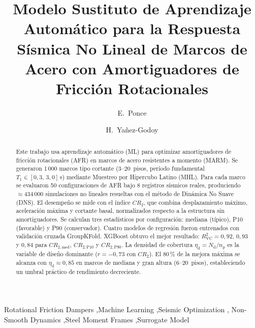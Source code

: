 \documentclass[preprint,12pt,authoryear]{elsarticle}
\newcommand{\CR}[1]{CR_{2,\text{#1}}}
\newcommand{\Rsq}{R^{2}_{\mathrm{VC}}}
\newcommand{\nd}{N_{\mathrm{d}}}
\newcommand{\np}{n_{\mathrm{p}}}
\newcommand{\etad}{\eta_{\mathrm{d}}}
\begin{document}
\begin{frontmatter}

\title{Modelo Sustituto de Aprendizaje Automático para la Respuesta Sísmica
       No Lineal de Marcos de Acero con Amortiguadores de Fricción Rotacionales}

\author[uaq]{E.~Ponce}
\author[i2m]{H.~Yañez-Godoy}

\address[uaq]{Universidad Autónoma de Querétaro, Facultad de Ingeniería,
              Cerro de las Campanas s/n, Querétaro, México}
\address[i2m]{Arts et Metiers Institute of Technology, University of Bordeaux,
              Centre National de la Recherche Scientifique (CNRS),
              Bordeaux INP, I2M, UMR 5295, 33400 Talence, France}

\begin{abstract}
Este trabajo usa aprendizaje automático (ML) para optimizar amortiguadores de
fricción rotacionales (AFR) en marcos de acero resistentes a momento (MARM).
Se generaron 1\,000 marcos tipo cortante (3--20~pisos, período fundamental
$T_1 \in [0{,}3,\,3{,}0]$\,s) mediante Muestreo por Hipercubo Latino (MHL).
Para cada marco se evaluaron 50 configuraciones de AFR bajo 8 registros
sísmicos reales, produciendo $\approx$434\,000 simulaciones no lineales
resueltas con el método de Dinámica No Suave (DNS). El desempeño se mide con
el índice $CR_2$, que combina desplazamiento máximo, aceleración máxima y
cortante basal, normalizados respecto a la estructura sin amortiguadores. Se
calculan tres estadísticos por configuración: mediana (típico), P10 (favorable)
y P90 (conservador). Cuatro modelos de regresión fueron entrenados con
validación cruzada GroupKFold. XGBoost obtuvo el mejor resultado:
$\Rsq = 0{,}92$, $0{,}93$ y $0{,}84$ para $\CR{med}$, $\CR{P10}$ y
$\CR{P90}$. La densidad de cobertura $\etad = \nd/\np$ es la variable de
diseño dominante ($r=-0{,}73$ con $CR_2$). El 80\,\% de la mejora máxima se
alcanza con $\etad \approx 0{,}85$ en marcos de mediana y gran altura
(6--20~pisos), estableciendo un umbral práctico de rendimiento decreciente.
\end{abstract}

\begin{keyword}
Rotational Friction Dampers \sep Machine Learning \sep Seismic Optimization \sep
Non-Smooth Dynamics \sep Steel Moment Frames \sep Surrogate Model 
\end{keyword}

\end{frontmatter}
\end{document}
